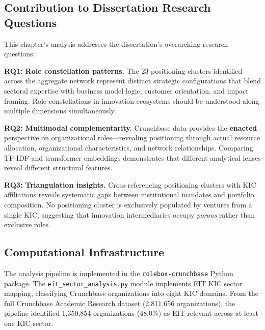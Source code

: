 \documentclass[../main.tex]{subfiles}
\begin{document}
\subsection{Contribution to Dissertation Research Questions}

This chapter's analysis addresses the dissertation's overarching research questions:

\textbf{RQ1: Role constellation patterns.} The 23 positioning clusters identified across the aggregate network represent distinct strategic configurations that blend sectoral expertise with business model logic, customer orientation, and impact framing. Role constellations in innovation ecosystems should be understood along multiple dimensions simultaneously.

\textbf{RQ2: Multimodal complementarity.} Crunchbase data provides the \textbf{enacted} perspective on organizational roles---revealing positioning through actual resource allocation, organizational characteristics, and network relationships. Comparing TF-IDF and transformer embeddings demonstrates that different analytical lenses reveal different structural features.

\textbf{RQ3: Triangulation insights.} Cross-referencing positioning clusters with KIC affiliations reveals systematic gaps between institutional mandates and portfolio composition. No positioning cluster is exclusively populated by ventures from a single KIC, suggesting that innovation intermediaries occupy \emph{porous} rather than exclusive roles.

\subsection{Computational Infrastructure}

The analysis pipeline is implemented in the \texttt{rolebox-crunchbase} Python package. The \texttt{eit\_sector\_analysis.py} module implements EIT KIC sector mapping, classifying Crunchbase organizations into eight KIC domains. From the full Crunchbase Academic Research dataset (2,811,656 organizations), the pipeline identified 1,350,854 organizations (48.0\%) as EIT-relevant across at least one KIC sector.
\end{document}
